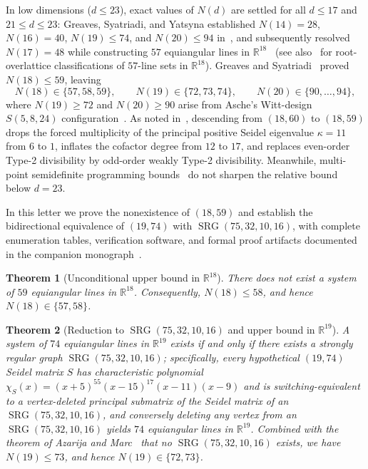 \documentclass[11pt,reqno]{amsart}
\newtheorem{theorem}{Theorem}[section]
\theoremstyle{definition}
\theoremstyle{remark}
\DeclareMathOperator{\SRG}{SRG}
\begin{document}
In low dimensions ($d \le 23$), exact values of $N(d)$ are settled for all $d \le 17$ and $21 \le d \le 23$: Greaves, Syatriadi, and Yatsyna established $N(14) = 28$, $N(16) = 40$, $N(19) \le 74$, and $N(20) \le 94$ in~\cite{GSY2021}, and subsequently resolved $N(17) = 48$ while constructing $57$ equiangular lines in $\mathbb{R}^{18}$~\cite{GSY2023} (see also~\cite{LMTY2025,MSY2026} for root-overlattice classifications of $57$-line sets in $\mathbb{R}^{18}$). Greaves and Syatriadi~\cite{GS2024} proved $N(18) \le 59$, leaving
\[
  N(18) \in \{57, 58, 59\}, \qquad N(19) \in \{72, 73, 74\}, \qquad N(20) \in \{90, \dots, 94\},
\]
where $N(19) \ge 72$ and $N(20) \ge 90$ arise from Asche's Witt-design $S(5,8,24)$ configuration~\cite{Taylor1977,LinYu2020}. As noted in~\cite[\S 9]{GSY2023}, descending from $(18, 60)$ to $(18, 59)$ drops the forced multiplicity of the principal positive Seidel eigenvalue $\kappa = 11$ from $6$ to $1$, inflates the cofactor degree from $12$ to $17$, and replaces even-order Type-2 divisibility by odd-order weakly Type-2 divisibility. Meanwhile, multi-point semidefinite programming bounds~\cite{BargYu2014,deLaat2022,KaoYu2022} do not sharpen the relative bound below $d = 23$.

In this letter we prove the nonexistence of $(18, 59)$ and establish the bidirectional equivalence of $(19, 74)$ with $\SRG(75, 32, 10, 16)$, with complete enumeration tables, verification software, and formal proof artifacts documented in the companion monograph~\cite{CompanionFull}.

\begin{theorem}[Unconditional upper bound in $\mathbb{R}^{18}$]\label{thm:main18}
There does not exist a system of $59$ equiangular lines in $\mathbb{R}^{18}$. Consequently, $N(18) \le 58$, and hence $N(18) \in \{57, 58\}$.
\end{theorem}

\begin{theorem}[Reduction to $\SRG(75, 32, 10, 16)$ and upper bound in $\mathbb{R}^{19}$]\label{thm:main19}
A system of $74$ equiangular lines in $\mathbb{R}^{19}$ exists if and only if there exists a strongly regular graph $\SRG(75, 32, 10, 16)$; specifically, every hypothetical $(19, 74)$ Seidel matrix $S$ has characteristic polynomial $\chi_S(x) = (x+5)^{55}(x-15)^{17}(x-11)(x-9)$ and is switching-equivalent to a vertex-deleted principal submatrix of the Seidel matrix of an $\SRG(75, 32, 10, 16)$, and conversely deleting any vertex from an $\SRG(75, 32, 10, 16)$ yields $74$ equiangular lines in $\mathbb{R}^{19}$. Combined with the theorem of Azarija and Marc~\cite{AzarijaMarc2018} that no $\SRG(75, 32, 10, 16)$ exists, we have $N(19) \le 73$, and hence $N(19) \in \{72, 73\}$.
\end{theorem}
\end{document}
